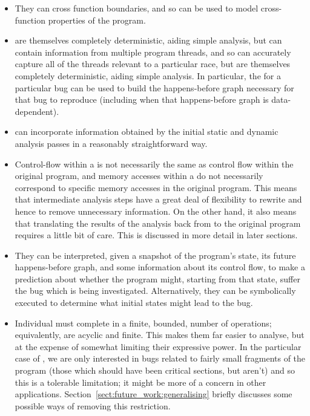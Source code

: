 \begin{itemize}
\item
  They can cross function boundaries, and so can be used to model
  cross-function properties of the program.
\item
  {\STateMachines} are themselves completely deterministic, aiding
  simple analysis, but can contain information from multiple program
  threads, and so can accurately capture all of the threads relevant
  to a particular race, but are themselves completely deterministic,
  aiding simple analysis.  In particular, the {\StateMachine} for a
  particular bug can be used to build the happens-before graph
  necessary for that bug to reproduce (including when that
  happens-before graph is data-dependent).
\item
  {\STateMachines} can incorporate information obtained by the initial
  static and dynamic analysis passes in a reasonably straightforward
  way.
\item
  Control-flow within a {\StateMachine} is not necessarily the same as
  control flow within the original program, and memory accesses within
  a {\StateMachine} do not necessarily correspond to specific memory
  accesses in the original program.  This means that intermediate
  analysis steps have a great deal of flexibility to rewrite
  {\StateMachines} and hence to remove unnecessary information.  On
  the other hand, it also means that translating the results of the
  analysis back from {\StateMachines} to the original program requires
  a little bit of care.  This is discussed in more detail in later
  sections.
\item
  They can be interpreted, given a snapshot of the program's state,
  its future happens-before graph, and some information about its
  control flow, to make a prediction about whether the program might,
  starting from that state, suffer the bug which is being
  investigated.  Alternatively, they can be symbolically executed to
  determine what initial states might lead to the bug.
\item
  Individual {\StateMachines} must complete in a finite, bounded,
  number of operations; equivalently, {\StateMachines} are acyclic and
  finite.  This makes them far easier to analyse, but at the expense
  of somewhat limiting their expressive power.  In the particular case
  of {\technique}, we are only interested in bugs related to fairly
  small fragments of the program (those which should have been
  critical sections, but aren't) and so this is a tolerable
  limitation; it might be more of a concern in other applications.
  Section~\ref{sect:future_work:generalising} briefly discusses some
  possible ways of removing this restriction.
\end{itemize}

